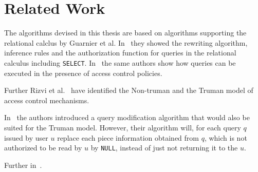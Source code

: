 \section{Related Work}

The algorithms devised in this thesis are based on algorithms supporting the relational calclus by Guarnier et al. In~\cite{guarnieri2016strong} they showed the rewriting algorithm, inference rules and the authorization function for queries in the relational calculus including \texttt{SELECT}.
%
In~\cite{guarnieri2014optimal} the same authors show how queries can be executed in the presence of access control policies.

Further Rizvi et al.~\cite{rizvi2004extending} have identified the Non-truman and the Truman model of access control mechanisms.

In~\cite{wang2007correctness} the authors introduced a query modification algorithm that would also be suited for the Truman model.
%
However, their algorithm will, for each query $q$ issued by user $u$ replace each piece information obtained from $q$, which is not authorized to be read by $u$ by \texttt{NULL}, instead of just not returning it to the $u$.

Further in~\cite{rizvi2004extending}.

